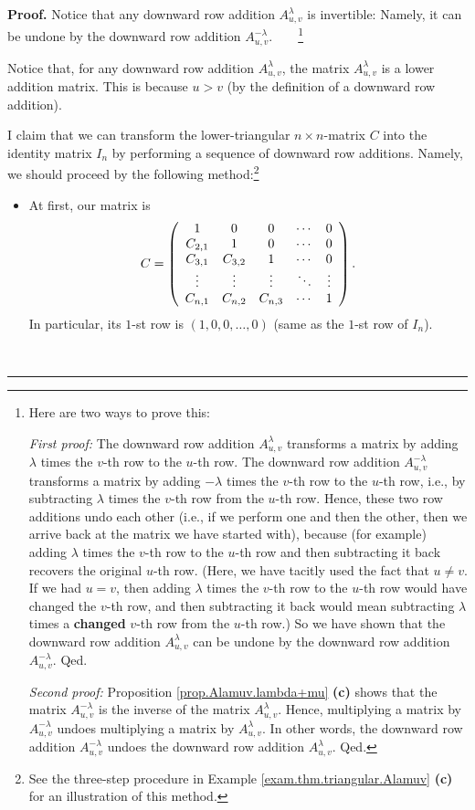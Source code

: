 \documentclass[numbers=enddot,12pt,final,onecolumn,notitlepage]{scrartcl}%
\theoremstyle{definition}
\newenvironment{proof}[1][Proof]{\noindent\textbf{#1.} }{\ \rule{0.5em}{0.5em}}
\begin{document}
\begin{proof}
Notice that any downward row addition $A_{u,v}^{\lambda}$ is invertible:
Namely, it can be undone by the downward row addition $A_{u,v}^{-\lambda}%
$.\ \ \ \ \footnote{Here are two ways to prove this:
\par
\textit{First proof:} The downward row addition $A_{u,v}^{\lambda}$ transforms
a matrix by adding $\lambda$ times the $v$-th row to the $u$-th row. The
downward row addition $A_{u,v}^{-\lambda}$ transforms a matrix by adding
$-\lambda$ times the $v$-th row to the $u$-th row, i.e., by subtracting
$\lambda$ times the $v$-th row from the $u$-th row. Hence, these two row
additions undo each other (i.e., if we perform one and then the other, then we
arrive back at the matrix we have started with), because (for example) adding
$\lambda$ times the $v$-th row to the $u$-th row and then subtracting it back
recovers the original $u$-th row. (Here, we have tacitly used the fact that
$u\neq v$. If we had $u=v$, then adding $\lambda$ times the $v$-th row to the
$u$-th row would have changed the $v$-th row, and then subtracting it back
would mean subtracting $\lambda$ times a \textbf{changed} $v$-th row from the
$u$-th row.) So we have shown that the downward row addition $A_{u,v}%
^{\lambda}$ can be undone by the downward row addition $A_{u,v}^{-\lambda}$.
Qed.
\par
\textit{Second proof:} Proposition \ref{prop.Alamuv.lambda+mu} \textbf{(c)}
shows that the matrix $A_{u,v}^{-\lambda}$ is the inverse of the matrix
$A_{u,v}^{\lambda}$. Hence, multiplying a matrix by $A_{u,v}^{-\lambda}$
undoes multiplying a matrix by $A_{u,v}^{\lambda}$. In other words, the
downward row addition $A_{u,v}^{-\lambda}$ undoes the downward row addition
$A_{u,v}^{\lambda}$. Qed.}

Notice that, for any downward row addition $A^{\lambda}_{u,v}$, the matrix
$A^{\lambda}_{u,v}$ is a lower addition matrix. This is because $u > v$ (by
the definition of a downward row addition).

I claim that we can transform the lower-triangular $n\times n$-matrix $C$ into
the identity matrix $I_{n}$ by performing a sequence of downward row
additions. Namely, we should proceed by the following method:\footnote{See the
three-step procedure in Example \ref{exam.thm.triangular.Alamuv} \textbf{(c)}
for an illustration of this method.}

\begin{itemize}
\item At first, our matrix is
\[
C = \left(
\begin{array}
[c]{ccccc}%
1 & 0 & 0 & \cdots & 0\\
C_{2,1} & 1 & 0 & \cdots & 0\\
C_{3,1} & C_{3,2} & 1 & \cdots & 0\\
\vdots & \vdots & \vdots & \ddots & \vdots\\
C_{n,1} & C_{n,2} & C_{n,3} & \cdots & 1
\end{array}
\right)  .
\]
In particular, its $1$-st row is $\left(  1,0,0,\ldots,0\right)  $ (same as
the $1$-st row of $I_{n}$).


\end{itemize}
\end{proof}
\end{document}

